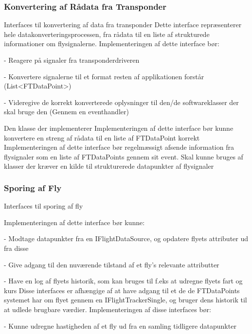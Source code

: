\subsubsection{Konvertering af Rådata fra Transponder}
{Interfaces til konvertering af data fra transponder}
Dette interface repræsenterer hele datakonverteringsprocessen, fra rådata til en liste af strukturede informationer om flysignalerne.
Implementeringen af dette interface bør:

- Reagere på signaler fra transponderdriveren

- Konvertere signalerne til et format resten af applikationen forstår (List<FTDataPoint>)

- Videregive de korrekt konverterede oplysninger til den/de softwareklasser der skal bruge den (Gennem en eventhandler)

Den klasse der implementerer
Implementeringen af dette interface bør kunne konvertere en streng af rådata til en liste af FTDataPoint korrekt
Implementeringen af dette interface bør regelmæssigt afsende information fra flysignaler som en liste af FTDataPoints gennem sit event. Skal kunne bruges af klasser der kræver en kilde til strukturerede datapunkter af flysignaler
\subsubsection{Sporing af Fly}

{Interfaces til sporing af fly}

Implementeringen af dette interface bør kunne:

- Modtage datapunkter fra en IFlightDataSource, og opdatere flyets attributer ud fra disse

- Give adgang til den nuværende tilstand af et fly's relevante attributter

- Have en log af flyets historik, som kan bruges til f.eks at udregne flyets fart og kurs
Disse interfaces er afhængige af at have adgang til et de de FTDataPoints systemet har om flyet gennem en IFlightTrackerSingle, og bruger dens historik til at udlede brugbare værdier.
Implementeringen af disse interfaces bør:

- Kunne udregne hastigheden af et fly ud fra en samling tidligere datapunkter

